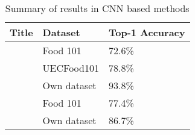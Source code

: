\begin{table}[h]
	\centering
	\caption{Summary of results in CNN based methods}
	\label{cnn_summary}
	\begin{tabular}{|l|l|l|}
	\hline
		\textbf{Title}                                & \textbf{Dataset}     & \textbf{Top-1 Accuracy} \\ \hline
		\parencite{deepLearning} 			 & Food 101    & 72.6\%  \\ \hline
		\parencite{yanaiFood}               	 & UECFood101  & 78.8\%  \\ \hline
		\parencite{kagayaFood}       		 & Own dataset & 93.8\%   \\ \hline
		\parencite{deepFood}                  & Food 101    & 77.4\%  	\\ \hline
		\parencite{nutrinet}                  & Own dataset & 86.7\% \\ \hline
	\end{tabular}
\end{table}

